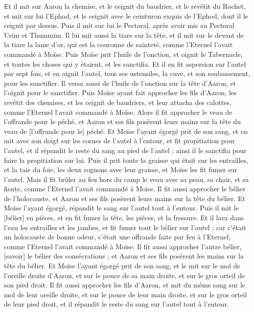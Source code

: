 \begin{multicols}{2}
Et il mit sur Aaron la chemise, et le ceignit du baudrier, et le revêtit du Rochet, et mit sur lui l'Ephod, et le ceignit avec le ceinturon exquis de l'Ephod, dont il le ceignit par dessus.
Puis il mit sur lui le Pectoral, après avoir mis au Pectoral Urim et Thummim.
Il lui mit aussi la tiare sur la tête, et il mit sur le devant de la tiare la lame d'or, qui est la couronne de sainteté, comme l'Eternel l'avait commandé à Moïse.
Puis Moïse prit l'huile de l'onction, et oignit le Tabernacle, et toutes les choses qui y étaient, et les sanctifia.
Et il en fit aspersion sur l'autel par sept fois, et en oignit l'autel, tous ses ustensiles, la cuve, et son soubassement, pour les sanctifier.
Il versa aussi de l'huile de l'onction sur la tête d'Aaron, et l'oignit pour le sanctifier.
Puis Moïse ayant fait approcher les fils d'Aaron, les revêtit des chemises, et les ceignit de baudriers, et leur attacha des calottes, comme l'Eternel l'avait commandé à Moïse.
Alors il fit approcher le veau de l'offrande pour le péché, et Aaron et ses fils posèrent leurs mains sur la tête du veau de [l'offrande pour le] péché.
Et Moïse l'ayant égorgé prit de son sang, et en mit avec son doigt sur les cornes de l'autel à l'entour, et fit propitiation pour l'autel, et il répandit le reste du sang au pied de l'autel ; ainsi il le sanctifia pour faire la propitiation sur lui.
Puis il prit toute la graisse qui était sur les entrailles, et la taie du foie, les deux rognons avec leur graisse, et Moïse les fit fumer sur l'autel.
Mais il fit brûler au feu hors du camp le veau avec sa peau, sa chair, et sa fiente, comme l'Eternel l'avait commandé à Moïse.
Il fit aussi approcher le bélier de l'holocauste, et Aaron et ses fils posèrent leurs mains sur la tête du bélier.
Et Moïse l'ayant égorgé, répandit le sang sur l'autel tout à l'entour.
Puis il mit le [bélier] en pièces, et en fit fumer la tête, les pièces, et la fressure.
Et il lava dans l'eau les entrailles et les jambes, et fit fumer tout le bélier sur l'autel ; car c'était un holocauste de bonne odeur, c'était une offrande faite par feu à l'Eternel, comme l'Eternel l'avait commandé à Moïse.
Il fit aussi approcher l'autre bélier, [savoir] le bélier des consécrations ; et Aaron et ses fils posèrent les mains sur la tête du bélier.
Et Moïse l'ayant égorgé prit de son sang, et le mit sur le mol de l'oreille droite d'Aaron, et sur le pouce de sa main droite, et sur le gros orteil de son pied droit.
Il fit aussi approcher les fils d'Aaron, et mit du même sang sur le mol de leur oreille droite, et sur le pouce de leur main droite, et sur le gros orteil de leur pied droit, et il répandit le reste du sang sur l'autel tout à l'entour.

\end{multicols}
